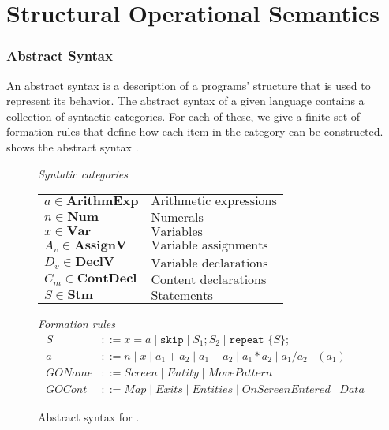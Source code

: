 \section{Structural Operational Semantics}

\subsubsection*{Abstract Syntax}
An abstract syntax is a description of a programs' structure that is used to represent its behavior. 
The abstract syntax of a given language contains a collection of syntactic categories. 
For each of these, we give a finite set of formation rules that define how each item in the category can be constructed.
 shows the abstract syntax \dazel{}.





\begin{figure}[htbp]
	\centering
	\textit{Syntatic categories}
	\vspace{4mm}


	\begin{tabular}{l l}
		$a \in \textbf{ArithmExp}$ & $\text{Arithmetic expressions}$ \\ 
		$n \in \textbf{Num}$ & $\text{Numerals}$ \\
		$x \in \textbf{Var}$ & $\text{Variables}$ \\
		$A_v \in \textbf{AssignV}$ & $\text{Variable assignments}$ \\
		$D_v \in \textbf{DeclV}$ & $\text{Variable declarations}$ \\
		$C_m \in \textbf{ContDecl}$ & $\text{Content declarations}$ \\
		$S \in \textbf{Stm}$ & $\text{Statements}$
	\end{tabular}

	\vspace{4mm}
	\textit{Formation rules}
	\begin{align*}
		S&::=x=a\mid \texttt{skip}\mid S_1;S_2\mid \texttt{repeat }\{S\}; \\
		a&::=n\mid x\mid a_1+a_2\mid a_1-a_2\mid a_1*a_2\mid a_1/a_2\mid (a_1) \\
		GOName&::= \textit{Screen} \mid \textit{Entity} \mid \textit{MovePattern} \\
		GOCont&::= \textit{Map} \mid \textit{Exits} \mid \textit{Entities} \mid \textit{OnScreenEntered} \mid \textit{Data}
	\end{align*}

	\caption{Abstract syntax for \dazel{}.}
	\label{fig:AbstractSyntax}
\end{figure}

